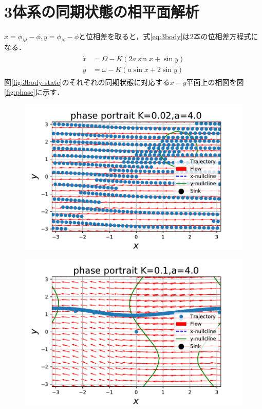 \documentclass[../main]{subfiles}
\begin{document}
\section{3体系の同期状態の相平面解析}
$x=\phi_M-\phi,y=\phi_N-\phi$と位相差を取ると，式\eqref{eq:3body}は2本の位相差方程式になる．
\begin{align}
    \label{eq:phase-diff}
    \begin{split}
    \dot{x}&=\Omega-K(2a\sin x+\sin y)\\
    \dot{y}&=\omega-K(a\sin x+2\sin y)
    \end{split}
\end{align}
図\eqref{fig:3body-state}のそれぞれの同期状態に対応する$x-y$平面上の相図を図\ref{fig:phase}に示す．

\captionsetup[figure]{justification=centering}
\begin{figure}[t]
    \begin{minipage}[b]{0.47\linewidth}
      \centering
      \includegraphics[keepaspectratio, scale=0.42]{images/phase_a4K2.pdf}
      \label{fig:phase-k2}
    \end{minipage}
    \begin{minipage}[b]{0.47\linewidth}
      \centering
      \includegraphics[keepaspectratio, scale=0.42]{images/phase_a4K10.pdf}

\end{minipage}
\end{figure}
\end{document}
